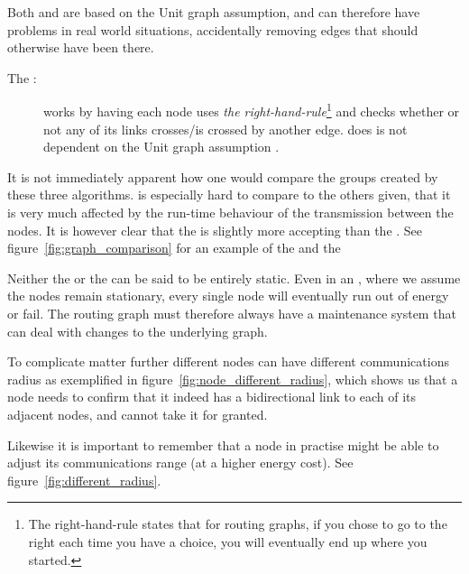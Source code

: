 \documentclass[letter, 12pt, english, draft]{article}
\begin{document}
Both \gabe and \rng are based on the Unit graph assumption, and can therefore have problems in real world situations, accidentally removing edges that should otherwise have been there\cite{practical}.

\begin{description}
\item[The \cldp:] \cldp works by having each node uses \emph{the right-hand-rule}\footnote{The right-hand-rule states that for routing graphs, if you chose to go to the right each time you have a choice, you will eventually end up where you started.} and checks whether or not any of its links crosses/is crossed by another edge. \cldp does is not dependent on the Unit graph assumption \cite{practical}. 
\end{description}


It is not immediately apparent how one would compare the groups created by these three algorithms. \cldp is especially hard to compare to the others given, that it is very much affected by the run-time behaviour of the transmission between the nodes. It is however clear that the \rng is slightly more accepting than the \gabe. See figure~\ref{fig:graph_comparison} for an example of the \rng and the \

Neither the \manet or the \anet can be said to be entirely static. Even in an \anet, where we assume the nodes remain stationary, every single node will eventually run out of energy or fail. The routing graph must therefore always have a maintenance system that can deal with changes to the underlying graph. 

To complicate matter further different nodes can have different communications radius as exemplified in figure~\ref{fig:node_different_radius}, which shows us that a node needs to confirm that it indeed has a bidirectional link to each of its adjacent nodes, and cannot take it for granted.


Likewise it is important to remember that a node in practise might be able to adjust its communications range (at a higher energy cost). See figure~\ref{fig:different_radius}.
\end{document}
